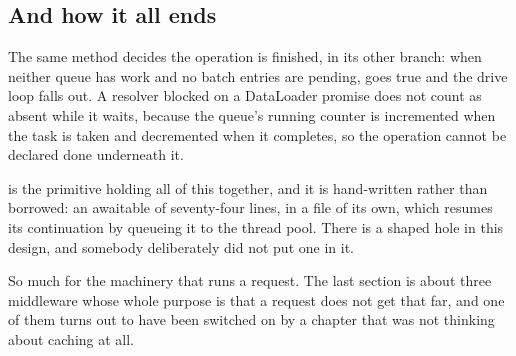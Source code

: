 \subsection*{And how it all ends}

%
The same method decides the operation is finished, in its other branch: when
neither queue has work and no batch entries are pending, 
goes true and the drive loop falls out. A resolver blocked on a DataLoader
promise does not count as absent while it waits, because the queue's running
counter is incremented when the task is taken and decremented when it completes,
so the operation cannot be declared done underneath it.

 is the primitive holding all of this together, and
it is hand-written rather than borrowed: an awaitable of seventy-four lines, in
a file of its own, which resumes its continuation by queueing it to the thread
pool. There is a  shaped hole in this design, and somebody
deliberately did not put one in it.

\medskip
So much for the machinery that runs a request. The last section is about three
middleware whose whole purpose is that a request does not get that far, and one
of them turns out to have been switched on by a chapter that was not thinking
about caching at all.

